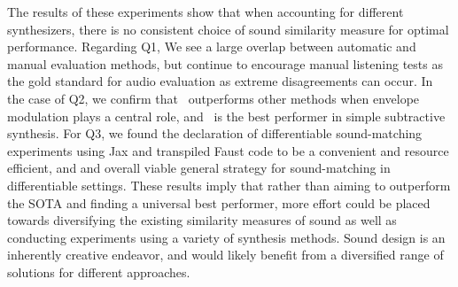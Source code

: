 The results of these experiments show that when accounting for different synthesizers, there is no consistent choice of sound similarity measure for optimal performance. Regarding Q1, We see a large overlap between automatic and manual evaluation methods, but continue to encourage manual listening tests as the gold standard for audio evaluation as extreme disagreements can occur. In the case of Q2, we confirm that \DTWEnv~outperforms other methods when envelope modulation plays a central role, and \SIMSESpec~is the best performer in simple subtractive synthesis. For Q3, we found the declaration of differentiable sound-matching experiments using Jax and transpiled Faust code to be a convenient and resource efficient, and and overall viable general strategy for sound-matching in differentiable settings. These results imply that rather than aiming to outperform the SOTA and finding a universal best performer, more effort could be placed towards diversifying the existing similarity measures of sound as well as conducting experiments using a variety of synthesis methods. Sound design is an inherently creative endeavor, and would likely benefit from a diversified range of solutions for different approaches.





